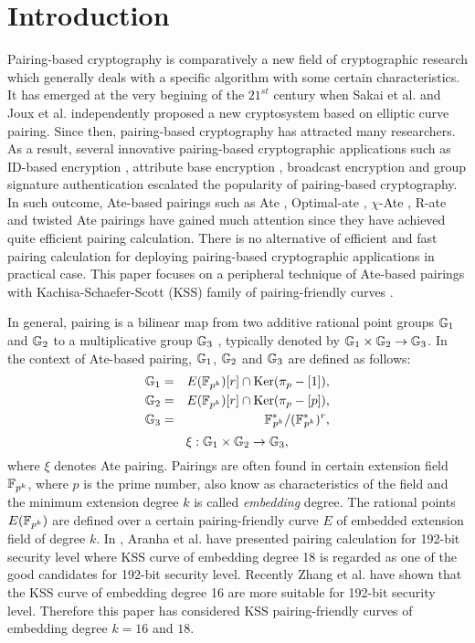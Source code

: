 \section{Introduction}
Pairing-based cryptography is comparatively a new field of cryptographic research which generally deals with a specific algorithm with  some certain characteristics.
It has emerged at the very begining of the $21^{st}$ century when Sakai et al. \cite{sakai2000cryptosystems} and Joux et al. \cite{JC:Joux04} independently proposed a new cryptosystem based on elliptic curve pairing.
Since then, pairing-based cryptography has attracted many researchers. 
As a result,  several innovative pairing-based cryptographic applications such as ID-based encryption \cite{sakai2000cryptosystems}, attribute base encryption \cite{EPRINT:SahWat04}, broadcast encryption \cite{C:BonGenWat05} and group signature authentication \cite{C:BonBoySha04} escalated the popularity of pairing-based cryptography.
In such outcome, Ate-based pairings such as Ate \cite{DBLP:reference/crc/2005ehcc}, Optimal-ate \cite{DBLP:journals/tit/Vercauteren10}, $\chi$-Ate \cite{PAIRING:NASKM08}, R-ate \cite{r_ate} and  twisted Ate  \cite{EPRINT:MKHO07} pairings have gained much attention since they have achieved quite efficient pairing calculation. 
There is no alternative of efficient and fast pairing calculation for deploying pairing-based cryptographic applications in practical case. 
This paper focuses on a peripheral technique of Ate-based pairings with Kachisa-Schaefer-Scott (KSS) family of pairing-friendly curves \cite{EPRINT:KacSchSco07}. 

In general, pairing is a bilinear map from two additive rational point groups ${\mathbb{G}}_{1}$ and ${\mathbb{G}}_{2}$ to a multiplicative group ${\mathbb{G}}_{3}$ \cite{Silverman}, typically denoted by ${\mathbb{G}}_{1} \times {\mathbb{G}}_{2} \rightarrow {\mathbb{G}}_{3}$.
In the context of Ate-based pairing, ${\mathbb{G}}_{1}$, ${\mathbb{G}}_{2}$ and ${\mathbb{G}}_{3}$ are defined as follows:
\begin{eqnarray}\label{eq:g_1}
{\mathbb{G}}_{1} & = &  E({\mathbb{F}}_{p^{k}}) [r] \cap \text{Ker}(\pi_p - [1]), \nonumber \\
{\mathbb{G}}_{2} & = &  E({\mathbb{F}}_{p^{k}}) [r] \cap \text{Ker}(\pi_p - [p]), \nonumber \\
{\mathbb{G}}_{3} & = & {{\mathbb{F}}^{\ast}}_{\!\!\!p^{k}}/({{\mathbb{F}}^{\ast}}_{\!\!\!p^{k}})^r, \nonumber
\end{eqnarray}
\begin{equation}
\xi : {\mathbb{G}}_{1} \times {\mathbb{G}}_{2} \rightarrow {\mathbb{G}}_{3},  \nonumber
\end{equation}
where $\xi$ denotes Ate pairing. 
Pairings are often found in certain extension field $\mathbb{F}_{p^k}$, where $p$ is the prime number, also know as characteristics of the field and the minimum extension degree $k$ is called \textit{embedding} degree. 
The rational points $E(\mathbb{F}_{p^k})$ are defined over a certain pairing-friendly curve $E$ of embedded extension field of degree $k$. 
In \cite{PAIRING:AFKMR12}, Aranha et al. have presented pairing calculation for 192-bit security level where  KSS curve of embedding degree 18 is regarded as one of the good candidates for 192-bit security level.
Recently Zhang et al. \cite{INDOCRYPT:ZhaLin12} have shown that the KSS curve of embedding degree 16 are more suitable for 192-bit security level.
Therefore this paper has considered KSS pairing-friendly curves of embedding degree $k=16$ and $18$.

